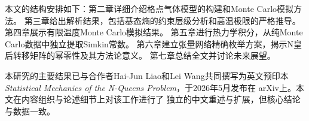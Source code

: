 本文的结构安排如下：第二章详细介绍格点气体模型的构建和Monte Carlo模拟方法。
第三章给出解析结果，包括基态熵的约束层级分析和高温极限的严格推导。
第四章展示有限温度Monte Carlo模拟结果。
第五章进行热力学积分，从纯Monte Carlo数据中独立提取Simkin常数。
第六章建立张量网络精确枚举方案，揭示N皇后转移矩阵的幂零性及其方法论意义。
第七章总结全文并讨论未来展望。

本研究的主要结果已与合作者Hai-Jun Liao和Lei Wang共同撰写为英文预印本
\textit{Statistical Mechanics of the N-Queens Problem}，于2026年5月发布在
arXiv\cite{Liu2026arxiv}上。本文在内容组织与论述细节上对该工作进行了
独立的中文重述与扩展，但核心结论与数据一致。
